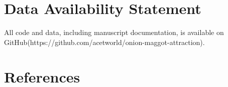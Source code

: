\documentclass[alpha-refs]{wiley-article}
\begin{document}
\section*{Data Availability Statement}
All code and data, including manuscript documentation, is available on GitHub(https://github.com/acetworld/onion-maggot-attraction).



\section{References}




\end{document}
